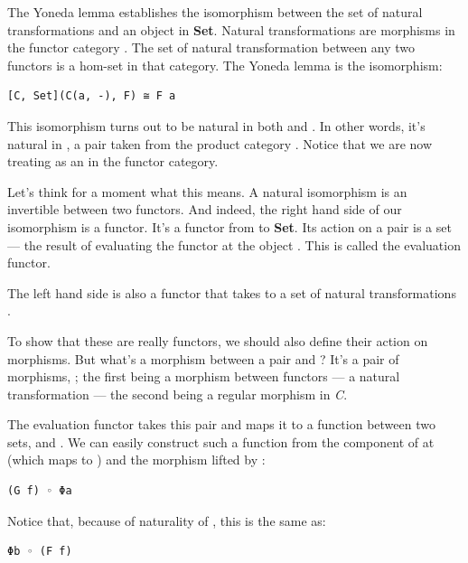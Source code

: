The Yoneda lemma establishes the isomorphism between the set of natural
transformations and an object in \textbf{Set}. Natural transformations
are morphisms in the functor category \code{{[}C,\ Set{]}}. The set of
natural transformation between any two functors is a hom-set in that
category. The Yoneda lemma is the isomorphism:

\begin{verbatim}
[C, Set](C(a, -), F) ≅ F a
\end{verbatim}

This isomorphism turns out to be natural in both  and
. In other words, it's natural in , a pair
taken from the product category . Notice
that we are now treating  as an  in the functor
category.

Let's think for a moment what this means. A natural isomorphism is an
invertible  between two functors. And
indeed, the right hand side of our isomorphism is a functor. It's a
functor from  to \textbf{Set}. Its action on
a pair  is a set --- the result of evaluating the
functor  at the object . This is called the
evaluation functor.

The left hand side is also a functor that takes  to a
set of natural transformations .

To show that these are really functors, we should also define their
action on morphisms. But what's a morphism between a pair
 and ? It's a pair of morphisms,
; the first being a morphism between functors --- a
natural transformation --- the second being a regular morphism in
\emph{C}.

The evaluation functor takes this pair  and maps it to a
function between two sets,  and . We can
easily construct such a function from the component of  at
 (which maps  to ) and the morphism
 lifted by :

\begin{verbatim}
(G f) ◦ Φa
\end{verbatim}

Notice that, because of naturality of , this is the same as:

\begin{verbatim}
Φb ◦ (F f)
\end{verbatim}

